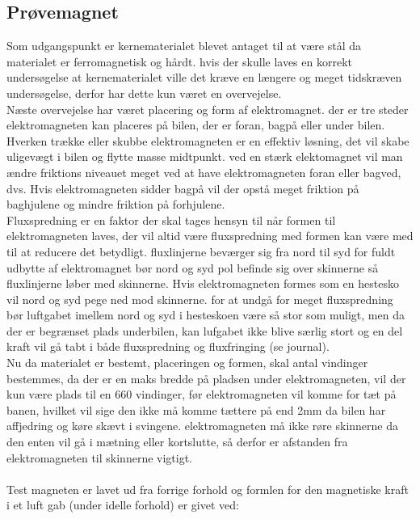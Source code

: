 \subsection{Prøvemagnet}
Som udgangspunkt er kernematerialet blevet antaget til at være stål da materialet er ferromagnetisk og hårdt. hvis der skulle laves en korrekt undersøgelse at kernematerialet ville det kræve en længere og meget tidskræven undersøgelse, derfor har dette kun været en overvejelse. \\
Næste overvejelse har været placering og form af elektromagnet. der er tre steder elektromagneten kan placeres på bilen, der er foran, bagpå eller under bilen.\\
Hverken trække eller skubbe elektromagneten er en effektiv løsning, det vil skabe uligevægt i bilen og flytte masse midtpunkt. ved en stærk elektomagnet vil man ændre friktions niveauet meget ved at have elektromagneten foran eller bagved, dvs. Hvis elektromagneten sidder bagpå vil der opstå meget friktion på baghjulene og mindre friktion på forhjulene.\\
Fluxspredning er en faktor der skal tages hensyn til når formen til elektromagneten laves, der vil altid være fluxspredning med formen kan være med til at reducere det betydligt. fluxlinjerne beværger sig fra nord til syd for fuldt udbytte af elektromagnet bør nord og syd pol befinde sig over skinnerne så fluxlinjerne løber med skinnerne. Hvis elektromagneten formes som en hestesko vil nord og syd pege ned mod skinnerne. for at undgå for meget fluxspredning bør luftgabet imellem nord og syd i hesteskoen være så stor som muligt, men da der er begrænset plads underbilen, kan lufgabet ikke blive særlig stort og en del kraft vil gå tabt i både fluxspredning og fluxfringing (se journal).\\
Nu da materialet er bestemt, placeringen og formen, skal antal vindinger bestemmes, da der er en maks bredde på pladsen under elektromagneten, vil der kun være plads til en 660 vindinger, før elektromagneten vil komme for tæt på banen, hvilket vil sige den ikke må komme tættere på end 2mm da bilen har affjedring og køre skævt i svingene. elektromagneten må ikke røre skinnerne da den enten vil gå i mætning eller kortslutte, så derfor er afstanden fra elektromagneten til skinnerne vigtigt.\\
\\
Test magneten er lavet ud fra forrige forhold og formlen for den magnetiske kraft i et luft gab (under idelle forhold) er givet ved:\\
\\
